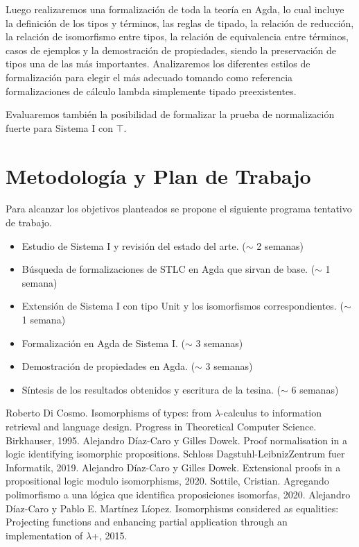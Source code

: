 \documentclass[a4paper,10pt]{article}
\begin{document}
Luego realizaremos una formalización de toda la teoría en Agda, lo cual incluye la definición de los tipos y términos, las reglas de tipado, la relación de reducción, la relación de isomorfismo entre tipos, la relación de equivalencia entre términos, casos de ejemplos y la demostración de propiedades, siendo la preservación de tipos una de las más importantes. Analizaremos los diferentes estilos de formalización para elegir el más adecuado tomando como referencia formalizaciones de cálculo lambda simplemente tipado preexistentes.

Evaluaremos también la posibilidad de formalizar la prueba de normalización fuerte para Sistema I con $\top$.

\section{Metodología y Plan de Trabajo}
Para alcanzar los objetivos planteados se propone el siguiente programa tentativo de trabajo.

\begin{itemize}
 \item Estudio de Sistema I y revisión del estado del arte. ($\sim$ 2 semanas)
 \item Búsqueda de formalizaciones de STLC en Agda que sirvan de base. ($\sim$ 1 semana)
 \item Extensión de Sistema I con tipo Unit y los isomorfismos correspondientes. ($\sim$ 1 semana)
 \item Formalización en Agda de Sistema I. ($\sim$ 3 semanas)
 \item Demostración de propiedades en Agda. ($\sim$ 3 semanas)
 \item Síntesis de los resultados obtenidos y escritura de la tesina. ($\sim$ 6 semanas)
\end{itemize}


\begin{thebibliography}{1}
     Roberto Di Cosmo. Isomorphisms of types: from $\lambda$-calculus to information retrieval and language design. Progress in Theoretical Computer Science. Birkhauser, 1995.
    Alejandro Díaz-Caro y Gilles Dowek. Proof normalisation in a logic identifying isomorphic propositions. Schloss Dagstuhl-LeibnizZentrum fuer Informatik, 2019.
    Alejandro Díaz-Caro y Gilles Dowek. Extensional proofs in a propositional logic modulo isomorphisms, 2020.
    Sottile, Cristian. Agregando polimorfismo a una lógica que identifica proposiciones isomorfas, 2020.
    Alejandro Díaz-Caro y Pablo E. Martínez Líopez. Isomorphisms considered as equalities: Projecting functions and enhancing partial application through an implementation of $\lambda$+, 2015.
\end{thebibliography}
\end{document}
